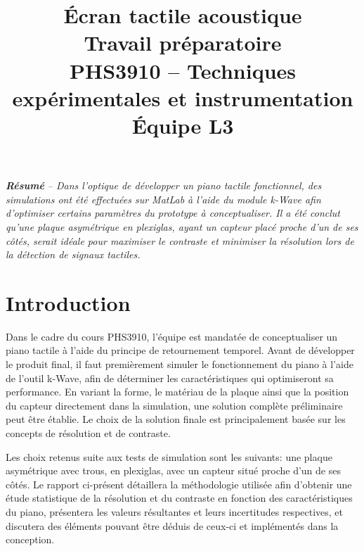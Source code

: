 \documentclass[conference]{IEEEtran}
\begin{document}
\title{Écran tactile acoustique\\
\large Travail préparatoire \\
PHS3910 -- Techniques expérimentales et instrumentation\\ 
Équipe L3}

\author{
\and
{}
\and
{}
\and
{}
}

\maketitle

\textit{\textbf{Résumé} -- Dans l'optique de développer un piano tactile fonctionnel,
des simulations ont été effectuées sur MatLab à l'aide du module k-Wave afin d'optimiser
certains paramètres du prototype à conceptualiser. Il a été conclut qu'une plaque asymétrique en plexiglas, ayant
un capteur placé proche d'un de ses côtés, serait idéale pour maximiser le contraste et minimiser la résolution 
lors de la détection de signaux tactiles.}


\section{Introduction}
Dans le cadre du cours PHS3910, l'équipe est mandatée de conceptualiser
un piano tactile à l'aide du principe de retournement temporel. Avant
de développer le produit final, il faut premièrement simuler le fonctionnement 
du piano à l'aide de l'outil k-Wave, afin de déterminer les caractéristiques qui 
optimiseront sa performance. En variant la forme, le matériau de 
la plaque ainsi que la position du capteur directement dans la simulation,
une solution complète préliminaire peut être établie. Le choix de la solution finale est
principalement basée sur les concepts de résolution et de contraste.

Les choix retenus suite aux tests de simulation sont les suivants: une plaque
asymétrique avec trous, en plexiglas, avec un capteur situé proche d'un de ses côtés.
Le rapport ci-présent détaillera la méthodologie utilisée afin d'obtenir 
une étude statistique de la résolution et du contraste en fonction des
caractéristiques du piano, présentera les valeurs résultantes et leurs incertitudes 
respectives, et discutera des éléments pouvant être déduis de ceux-ci et implémentés 
dans la conception.
\end{document}
